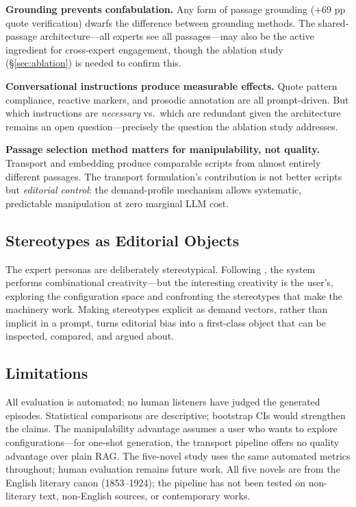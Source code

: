 \documentclass[final]{clv2025}
\begin{document}
\textbf{Grounding prevents confabulation.}  Any form of passage
grounding (+69 pp quote verification) dwarfs the difference between
grounding methods.  The shared-passage architecture---all experts see
all passages---may also be the active ingredient for cross-expert
engagement, though the ablation study (\S\ref{sec:ablation}) is
needed to confirm this.

\textbf{Conversational instructions produce measurable effects.}
Quote pattern compliance, reactive markers, and prosodic annotation
are all prompt-driven.  But which instructions are \emph{necessary}
vs.\ which are redundant given the architecture remains an open
question---precisely the question the ablation study addresses.

\textbf{Passage selection method matters for manipulability, not
quality.}  Transport and embedding produce comparable scripts from
almost entirely different passages.  The transport formulation's
contribution is not better scripts but \emph{editorial control}: the
demand-profile mechanism allows systematic, predictable manipulation
at zero marginal LLM cost.

\subsection{Stereotypes as Editorial Objects}

The expert personas are deliberately stereotypical.  Following
\citet{boden2004creative}, the system performs combinational
creativity---but the interesting creativity is the user's, exploring
the configuration space and confronting the stereotypes that make the
machinery work.  Making stereotypes explicit as demand vectors, rather
than implicit in a prompt, turns editorial bias into a first-class
object that can be inspected, compared, and argued about.

\subsection{Limitations}

All evaluation is automated; no human listeners have judged the
generated episodes.  Statistical comparisons are descriptive; bootstrap
CIs would strengthen the claims.  The manipulability advantage assumes a
user who wants to explore configurations---for one-shot generation, the
transport pipeline offers no quality advantage over plain RAG.  The
five-novel study uses the same automated metrics throughout; human
evaluation remains future work.  All five novels are from the English
literary canon (1853--1924); the pipeline has not been tested on
non-literary text, non-English sources, or contemporary works.
\end{document}
